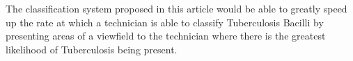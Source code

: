\documentclass{article}
\begin{document}
The classification system proposed in this article would be able to greatly speed up the rate at which a technician is able to classify Tuberculosis Bacilli by presenting areas of a
viewfield to the technician where there is the greatest likelihood of Tuberculosis being present.




\end{document}
